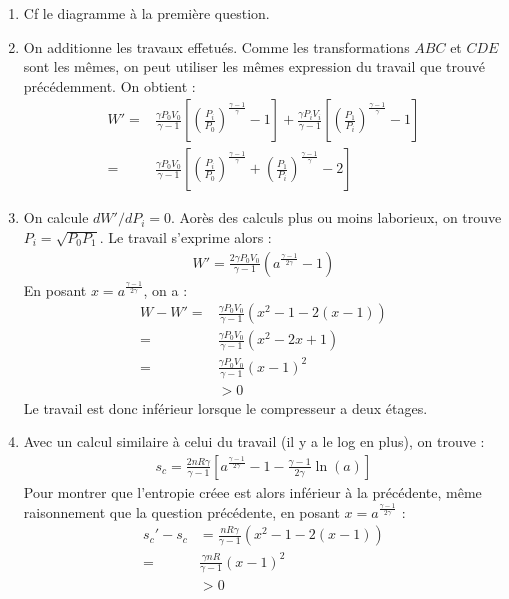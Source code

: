 \begin{correction}
\begin{enumerate}
\begin{enumerate}

\item Cf le diagramme à la première question.

\item On additionne les travaux effetués. Comme les transformations $ABC$ et $CDE$ sont les mêmes, on peut utiliser les mêmes expression du travail que trouvé précédemment. On obtient :
\begin{align*}
	W'=&\frac{\gamma P_0V_0}{\gamma-1}\left[\left( \frac{P_i}{P_0}\right) ^{\frac{\gamma-1}{\gamma}}-1 \right] +\frac{\gamma P_iV_i}{\gamma-1}\left[\left( \frac{P_1}{P_i}\right) ^{\frac{\gamma-1}{\gamma}}-1 \right] \\
	=&\frac{\gamma P_0V_0}{\gamma-1}\left[\left( \frac{P_i}{P_0}\right) ^{\frac{\gamma-1}{\gamma}}+\left( \frac{P_1}{P_i}\right) ^{\frac{\gamma-1}{\gamma}}-2 \right] 
\end{align*}
\item On calcule $dW'/dP_i=0$. Aorès des calculs plus ou moins laborieux, on trouve $P_i=\sqrt{P_0P_1}$. Le travail s'exprime alors :
\begin{align*}
	W'=\frac{2\gamma P_0V_0}{\gamma-1}\left(a^{\frac{\gamma-1}{2\gamma}}-1 \right) 
\end{align*}
En posant $x=a^{\frac{\gamma-1}{2\gamma}}$, on a :
\begin{align*}
 W-W'=&\frac{\gamma P_0V_0}{\gamma-1}\left(x^2-1-2(x-1) \right) \\
 =&\frac{\gamma P_0V_0}{\gamma-1}(x^2-2x+1) \\
 =&\frac{\gamma P_0V_0}{\gamma-1}(x-1)^2\\
 &>0 
\end{align*}
Le travail est donc inférieur lorsque le compresseur a deux étages.
 
\item Avec un calcul similaire à celui du travail (il y a le log en plus), on trouve :
\begin{align*}
		s_c =\frac{2nR\gamma}{\gamma-1}\left[a^\frac{\gamma-1}{2\gamma}-1-\frac{\gamma-1}{2\gamma}\ln\left( a \right) \right] 
\end{align*}
Pour montrer que l'entropie créee est alors inférieur à la précédente, même raisonnement que la question précédente, en posant $x=a^{\frac{\gamma-1}{2\gamma}}$ :
\begin{align*}
	s_c'-s_c&=\frac{nR\gamma}{\gamma-1}\left(x^2-1-2(x-1) \right) \\
	=&\frac{\gamma nR}{\gamma-1}(x-1)^2\\
 &>0 
\end{align*}


\end{enumerate}
\end{enumerate}
\end{correction}
